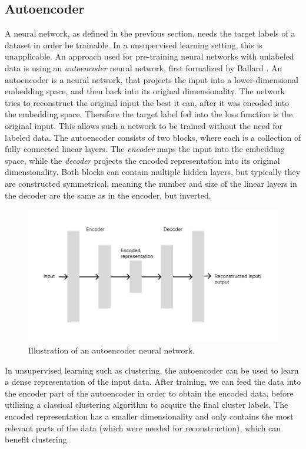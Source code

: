 \subsection{Autoencoder}

A neural network, as defined in the previous section, needs the target labels of a dataset in order be trainable. In a unsupervised learning setting, this is unapplicable. An approach used for pre-training neural networks with unlabeled data is using an \textit{autoencoder} neural network, first formalized by Ballard \cite{autoencoder}. An autoencoder is a neural network, that projects the input into a lower-dimensional embedding space, and then back into its original dimensionality. The network tries to reconstruct the original input the best it can, after it was encoded into the embedding space. Therefore the target label fed into the loss function is the original input. This allows such a network to be trained without the need for labeled data. The autoencoder consists of two blocks, where each is a collection of fully connected linear layers. The \textit{encoder} maps the input into the embedding space, while the \textit{decoder} projects the encoded representation into its original dimensionality. Both blocks can contain multiple hidden layers, but typically they are constructed symmetrical, meaning the number and size of the linear layers in the decoder are the same as in the encoder, but inverted. 

\begin{figure}
\centering
	\includegraphics[width=1.1\linewidth]{autoencoder.png}
	\caption{Illustration of an autoencoder neural network.}
	\label{autoencoder}
\end{figure}

In unsupervised learning such as clustering, the autoencoder can be used to learn a dense representation of the input data. After training, we can feed the data into the encoder part of the autoencoder in order to obtain the encoded data, before utilizing a classical clustering algorithm to acquire the final cluster labels. The encoded representation has a smaller dimensionality and only contains the most relevant parts of the data (which were needed for reconstruction), which can benefit clustering.

